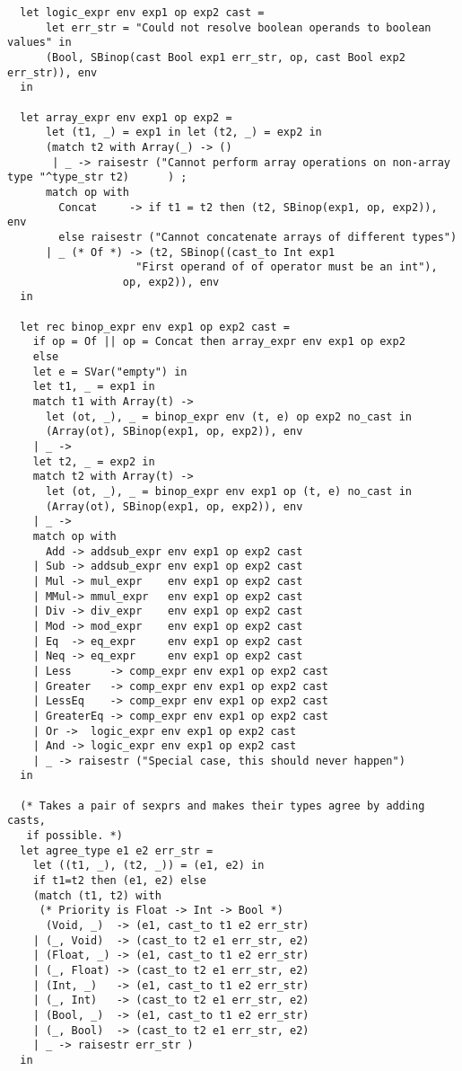 \documentclass[main.tex]{subfiles}
\begin{document}
\begin{lstlisting}
  let logic_expr env exp1 op exp2 cast = 
      let err_str = "Could not resolve boolean operands to boolean values" in
      (Bool, SBinop(cast Bool exp1 err_str, op, cast Bool exp2 err_str)), env
  in

  let array_expr env exp1 op exp2 = 
      let (t1, _) = exp1 in let (t2, _) = exp2 in
      (match t2 with Array(_) -> ()
       | _ -> raisestr ("Cannot perform array operations on non-array type "^type_str t2)      ) ;
      match op with
        Concat     -> if t1 = t2 then (t2, SBinop(exp1, op, exp2)), env
        else raisestr ("Cannot concatenate arrays of different types")
      | _ (* Of *) -> (t2, SBinop((cast_to Int exp1
                    "First operand of of operator must be an int"),
                  op, exp2)), env
  in

  let rec binop_expr env exp1 op exp2 cast = 
    if op = Of || op = Concat then array_expr env exp1 op exp2
    else
    let e = SVar("empty") in
    let t1, _ = exp1 in
    match t1 with Array(t) ->
      let (ot, _), _ = binop_expr env (t, e) op exp2 no_cast in
      (Array(ot), SBinop(exp1, op, exp2)), env
    | _ ->
    let t2, _ = exp2 in
    match t2 with Array(t) ->
      let (ot, _), _ = binop_expr env exp1 op (t, e) no_cast in
      (Array(ot), SBinop(exp1, op, exp2)), env
    | _ ->
    match op with
      Add -> addsub_expr env exp1 op exp2 cast
    | Sub -> addsub_expr env exp1 op exp2 cast
    | Mul -> mul_expr    env exp1 op exp2 cast
    | MMul-> mmul_expr   env exp1 op exp2 cast
    | Div -> div_expr    env exp1 op exp2 cast
    | Mod -> mod_expr    env exp1 op exp2 cast
    | Eq  -> eq_expr     env exp1 op exp2 cast
    | Neq -> eq_expr     env exp1 op exp2 cast
    | Less      -> comp_expr env exp1 op exp2 cast
    | Greater   -> comp_expr env exp1 op exp2 cast
    | LessEq    -> comp_expr env exp1 op exp2 cast
    | GreaterEq -> comp_expr env exp1 op exp2 cast
    | Or ->  logic_expr env exp1 op exp2 cast
    | And -> logic_expr env exp1 op exp2 cast
    | _ -> raisestr ("Special case, this should never happen")
  in

  (* Takes a pair of sexprs and makes their types agree by adding casts,
   if possible. *)
  let agree_type e1 e2 err_str =
    let ((t1, _), (t2, _)) = (e1, e2) in
    if t1=t2 then (e1, e2) else
    (match (t1, t2) with
     (* Priority is Float -> Int -> Bool *)
      (Void, _)  -> (e1, cast_to t1 e2 err_str)
    | (_, Void)  -> (cast_to t2 e1 err_str, e2)
    | (Float, _) -> (e1, cast_to t1 e2 err_str)
    | (_, Float) -> (cast_to t2 e1 err_str, e2)
    | (Int, _)   -> (e1, cast_to t1 e2 err_str)
    | (_, Int)   -> (cast_to t2 e1 err_str, e2)
    | (Bool, _)  -> (e1, cast_to t1 e2 err_str)
    | (_, Bool)  -> (cast_to t2 e1 err_str, e2)
    | _ -> raisestr err_str )
  in


\end{lstlisting}
\end{document}

